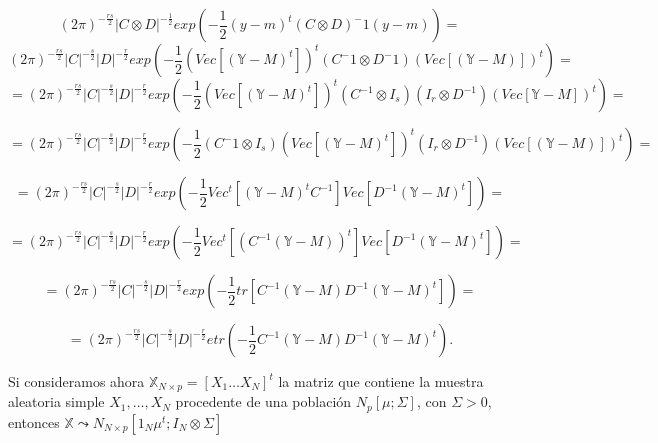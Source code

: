 \documentclass{article}
\theoremstyle{theorem-style}  %
\theoremstyle{definition-style}
\theoremstyle{example-style}
\theoremstyle{exercise-style}
\begin{document}
	$$ (2\pi)^{-\frac{rs}{2}}|C\otimes D|^{-\frac{1}{2}} exp(-\frac{1}{2}(y-m)^t(C \otimes D)^-1(y-m)) = $$
	$$ (2\pi)^{-\frac{rs}{2}}|C|^{-\frac{s}{2}} |D|^{-\frac{r}{2}} exp(-\frac{1}{2}(Vec[(\mathbb{Y}-M)^t])^t(C^-1 \otimes D^-1)(Vec[(\mathbb{Y}-M)])^t) =$$
	$$ = (2\pi)^{-\frac{rs}{2}}|C|^{-\frac{s}{2}} |D|^{-\frac{r}{2}} exp(-\frac{1}{2}(Vec[(\mathbb{Y}-M)^t])^t(C^{-1} \otimes I_s)(I_r \otimes D^{-1})(Vec[\mathbb{Y}-M])^t) = $$
	
	$$=  (2\pi)^{-\frac{rs}{2}}|C|^{-\frac{s}{2}} |D|^{-\frac{r}{2}} exp(-\frac{1}{2} (C^-{1} \otimes I_s)(Vec[(\mathbb{Y}-M)^t])^t(I_r \otimes D^{-1})(Vec[(\mathbb{Y}-M)])^t) = $$
	
	$$ = (2\pi)^{-\frac{rs}{2}}|C|^{-\frac{s}{2}} |D|^{-\frac{r}{2}} exp(-\frac{1}{2} Vec^t[(\mathbb{Y}-M)^tC^{-1}]Vec[D^{-1}(\mathbb{Y}-M)^t]) = $$

	$$ = (2\pi)^{-\frac{rs}{2}}|C|^{-\frac{s}{2}} |D|^{-\frac{r}{2}} exp(-\frac{1}{2} Vec^t[(C^{-1}(\mathbb{Y}-M))^t]Vec[D^{-1}(\mathbb{Y}-M)^t]) = $$
	
	$$ = (2\pi)^{-\frac{rs}{2}}|C|^{-\frac{s}{2}} |D|^{-\frac{r}{2}} exp(-\frac{1}{2} tr[C^{-1}(\mathbb{Y}-M)D^{-1}(\mathbb{Y}-M)^t]) = $$
	
	$$ = (2\pi)^{-\frac{rs}{2}}|C|^{-\frac{s}{2}} |D|^{-\frac{r}{2}} etr(-\frac{1}{2} C^{-1}(\mathbb{Y}-M)D^{-1}(\mathbb{Y}-M)^t). $$
	
	Si consideramos ahora $\mathbb{X}_{N\times p} = [X_1 \dots X_N]^t$ la matriz que contiene la muestra aleatoria simple $X_1, \dots, X_N$ procedente de una población $N_p[\mu; \Sigma]$, con $\Sigma>0$, entonces $\mathbb{X} \leadsto N_{N\times p}[1_N \mu^t; I_N \otimes \Sigma]$   
	
\end{document}
